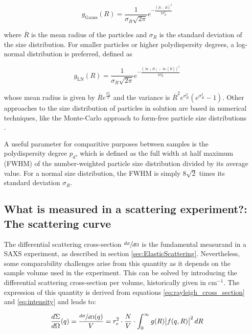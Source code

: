 \begin{equation}
        \label{eq:gauss_distribution}
       g_{\text{Gauss}}(R)=\frac{1}{\sigma_R \sqrt{2\pi}} e^{ - \frac{\left( R - \overline{R} \right)^2}{2\sigma_R^2} }
\end{equation}

where $\overline{R}$ is the mean radius of the particles and $\sigma_R$ is the standard deviation of the size distribution. For smaller particles or higher polydispersity degrees, a log-normal distribution is preferred, defined as

\begin{equation}
       g_{\text{LN}}(R)=\frac{1}{\sigma_R \sqrt{2\pi}} e^{ - \frac{\left( \ln(R) - \ln(\overline{R}) \right)^2}{2\sigma_R^2} }
\end{equation}

whose mean radius is given by $\overline{R} e^{\frac{\sigma_R^2}{2}}$ and the variance is $\overline{R}^2 e^{\sigma_R^2} (e^{\sigma_R^2} - 1)$. Other approaches to the size distribution of particles in solution are based in numerical techniques, like the Monte-Carlo approach to form-free particle size distributions \citep{pauw_improvements_2013}.

A useful parameter for comparitive purposes between samples is the polydispersity degree $p_d$, which is defined as the full width at half maximum (FWHM) of the number-weighted particle size distribution divided by its average value. For a normal size distribution, the FWHM is simply $8\sqrt{2}$ times its standard deviation $\sigma_R$.

\subsection{What is measured in a scattering experiment?: The scattering curve}

The differential scattering cross-section $\sfrac{d\sigma}{d\Omega}$ is the fundamental measurand in a SAXS experiment, as described in section \ref{sec:ElasticScattering}. Nevertheless, some comparability challenges arise from this quantity as it depends on the sample volume used in the experiment. This can be solved by introducing the differential scattering cross-section per volume, historically given in cm$^{-1}$. The expression of this quantity is derived from equations \ref{eq:rayleigh_cross_section} and \ref{eq:intensity} and leads to:

\begin{equation}
        \frac{d\Sigma}{d\Omega} (q) = \frac{\sfrac{d\sigma}{d\Omega}(q)}{V} = r_e^2 \cdot \frac{N}{V} \cdot \int_0^{\infty} g(R) \abs{ f(q,R) }^2 dR
\end{equation}

